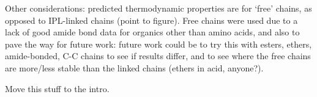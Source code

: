Other considerations: predicted thermodynamic properties are for `free' chains, as opposed to IPL-linked chains (point to figure). Free chains were used due to a lack of good amide bond data for organics other than amino acids, and also to pave the way for future work: future work could be to try this with esters, ethers, amide-bonded, C-C chains to see if results differ, and to see where the free chains are more/less stable than the linked chains (ethers in acid, anyone?).

Move this stuff to the intro.









